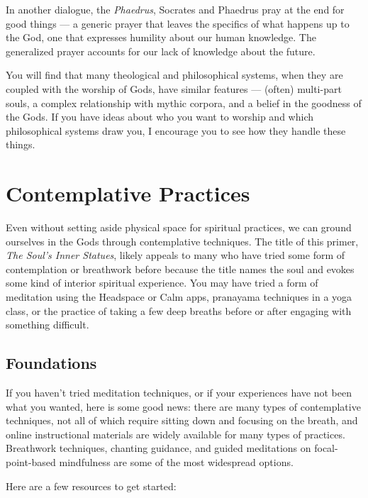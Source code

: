 \documentclass[
]{book}
\begin{document}
In another dialogue, the \emph{Phaedrus}, Socrates and Phaedrus pray at the end for good things --- a generic prayer that leaves the specifics of what happens up to the God, one that expresses humility about our human knowledge. The generalized prayer accounts for our lack of knowledge about the future.

You will find that many theological and philosophical systems, when they are coupled with the worship of Gods, have similar features --- (often) multi-part souls, a complex relationship with mythic corpora, and a belief in the goodness of the Gods. If you have ideas about who you want to worship and which philosophical systems draw you, I encourage you to see how they handle these things.

\hypertarget{contemplative-practices}{%
\section{Contemplative Practices}\label{contemplative-practices}}

Even without setting aside physical space for spiritual practices, we can ground ourselves in the Gods through contemplative techniques. The title of this primer, \emph{The Soul's Inner Statues}, likely appeals to many who have tried some form of contemplation or breathwork before because the title names the soul and evokes some kind of interior spiritual experience. You may have tried a form of meditation using the Headspace or Calm apps, pranayama techniques in a yoga class, or the practice of taking a few deep breaths before or after engaging with something difficult.

\hypertarget{foundations-1}{%
\subsection{Foundations}\label{foundations-1}}

If you haven't tried meditation techniques, or if your experiences have not been what you wanted, here is some good news: there are many types of contemplative techniques, not all of which require sitting down and focusing on the breath, and online instructional materials are widely available for many types of practices. Breathwork techniques, chanting guidance, and guided meditations on focal-point-based mindfulness are some of the most widespread options.

Here are a few resources to get started:
\end{document}
